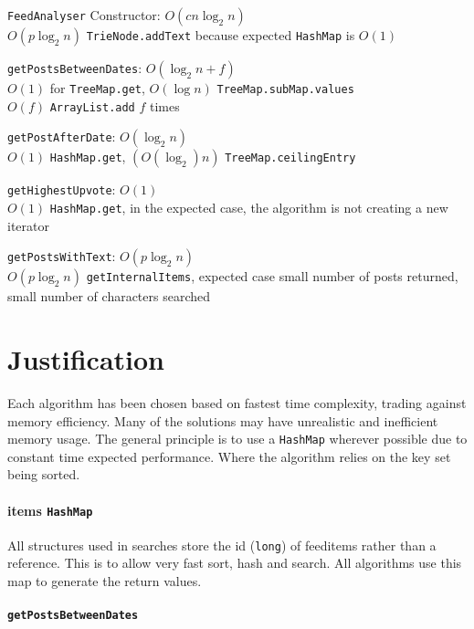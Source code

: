 \documentclass[11pt, oneside]{article}   	%
\begin{document}
\begin{description}

\item \texttt{FeedAnalyser} Constructor: $O(c n \log_2 n)$ \\ $O(p \log_2 n)$ \texttt{TrieNode.addText} because expected \texttt{HashMap} is $O(1)$ 
\item \texttt{getPostsBetweenDates}: $O(\log_2 n + f)$ \\ $O(1)$ for \texttt{TreeMap.get}, $O(\log n)$ \texttt{TreeMap.subMap.values} \\ $O(f)$ \texttt{ArrayList.add} $f$ times 
\item \texttt{getPostAfterDate}: $O(\log_2n)$ \\ $O(1)$ \texttt{HashMap.get}, $(O(\log_2) n)$ \texttt{TreeMap.ceilingEntry}
\item \texttt{getHighestUpvote}: $O(1)$ \\ $O(1)$ \texttt{HashMap.get}, in the expected case, the algorithm is not creating a new iterator 
\item \texttt{getPostsWithText}:  $O(p \log_2 n)$ \\ $O(p \log_2 n)$ \texttt{getInternalItems}, expected case small number of posts returned, small number of characters searched 

\end{description}

\section{Justification}

Each algorithm has been chosen based on fastest time complexity, trading against memory efficiency. Many of the solutions may have unrealistic and inefficient memory usage. The general principle is to use a \texttt{HashMap} wherever possible due to constant time expected performance. Where the algorithm relies on the key set being sorted. 

\paragraph{items \texttt{HashMap}}

All structures used in searches store the id (\texttt{long}) of feeditems rather than a reference. This is to allow very fast sort, hash and search. All algorithms use this map to generate the return values. 

\paragraph{\texttt{getPostsBetweenDates}}
\end{document}
